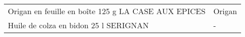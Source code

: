 \begin{longtable}{p{5cm}p{10cm}}
                                                      Origan en feuille en boîte 125 g LA CASE AUX EPICES &                                                                                                                                                                                                                                                                                                                                                                                                                                                                                                                                                                                                                                                                                                                                                                                                                                                                                                                                                                                                                                   Origan \\
                                                                    Huile de colza en bidon 25 l SERIGNAN &                                                                                                                                                                                                                                                                                                                                                                                                                                                                                                                                                                                                                                                                                                                                                                                                                                                                                                                                                                                                                                        - \\

\end{longtable}
